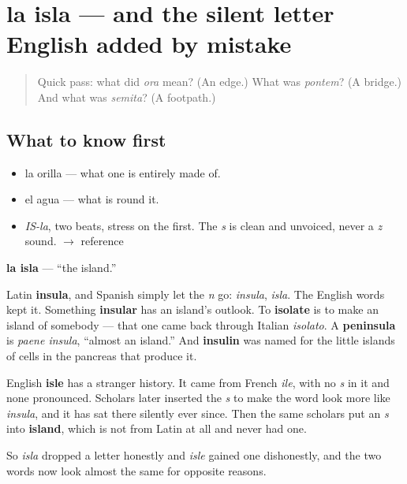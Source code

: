 \section[la isla]{la isla — and the silent letter English added by mistake}

\label{lesson:ES-C295-isla}



\begin{quote}
Quick pass: what did \emph{ora} mean? (An edge.) What was \emph{pontem}? (A bridge.) And what was \emph{semita}? (A footpath.)
\end{quote}

\subsection*{What to know first}
\begin{itemize}
\raggedright
  \item la orilla — what one is entirely made of.
  \item el agua — what is round it.
\end{itemize}

\begin{sounds}
\begin{itemize}
\raggedright
  \item \emph{IS-la}, two beats, stress on the first. The \emph{s} is clean and unvoiced, never a \emph{z} sound. $\to$ reference
\end{itemize}
\end{sounds}

\begin{cousinweb}
\textbf{la isla} — \textquotedblleft{}the island.\textquotedblright{}

Latin \textbf{insula}, and Spanish simply let the \emph{n} go: \emph{insula}, \emph{isla}. The English words kept it. Something \textbf{insular} has an island's outlook. To \textbf{isolate} is to make an island of somebody — that one came back through Italian \emph{isolato}. A \textbf{peninsula} is \emph{paene insula}, \textquotedblleft{}almost an island.\textquotedblright{} And \textbf{insulin} was named for the little islands of cells in the pancreas that produce it.

English \textbf{isle} has a stranger history. It came from French \emph{ile}, with no \emph{s} in it and none pronounced. Scholars later inserted the \emph{s} to make the word look more like \emph{insula}, and it has sat there silently ever since. Then the same scholars put an \emph{s} into \textbf{island}, which is not from Latin at all and never had one.

So \emph{isla} dropped a letter honestly and \emph{isle} gained one dishonestly, and the two words now look almost the same for opposite reasons.
\end{cousinweb}

